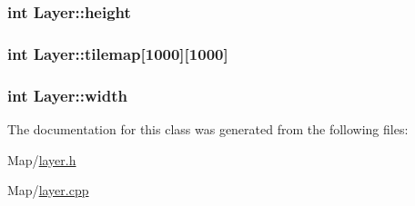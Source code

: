 \subsubsection[{\texorpdfstring{height}{height}}]{\setlength{\rightskip}{0pt plus 5cm}int Layer\+::height\hspace{0.3cm}{\ttfamily [protected]}}\hypertarget{classLayer_a6a0bc24033339368a0ca9747485f0053}{}\label{classLayer_a6a0bc24033339368a0ca9747485f0053}
\subsubsection[{\texorpdfstring{tilemap}{tilemap}}]{\setlength{\rightskip}{0pt plus 5cm}int Layer\+::tilemap\mbox{[}1000\mbox{]}\mbox{[}1000\mbox{]}\hspace{0.3cm}{\ttfamily [protected]}}\hypertarget{classLayer_a45c20f94cdebe331b0af278f1f127bab}{}\label{classLayer_a45c20f94cdebe331b0af278f1f127bab}
\subsubsection[{\texorpdfstring{width}{width}}]{\setlength{\rightskip}{0pt plus 5cm}int Layer\+::width\hspace{0.3cm}{\ttfamily [protected]}}\hypertarget{classLayer_a724d3020ddbe5f9280caa325541e70a3}{}\label{classLayer_a724d3020ddbe5f9280caa325541e70a3}


The documentation for this class was generated from the following files\+:\begin{DoxyCompactItemize}
\item 
Map/\hyperlink{layer_8h}{layer.\+h}\item 
Map/\hyperlink{layer_8cpp}{layer.\+cpp}\end{DoxyCompactItemize}
